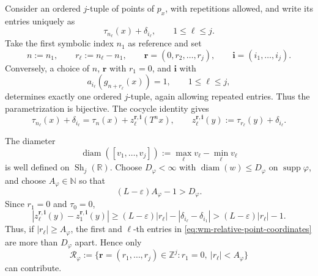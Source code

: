 \documentclass[11pt,reqno,a4paper]{amsart}
\numberwithin{equation}{section}
\theoremstyle{compact}
\theoremstyle{definition}
\theoremstyle{definition}
\newcommand{\Sh}{\operatorname{Sh}}
\begin{document}
Consider an ordered $j$-tuple of points of $p_x$, with repetitions allowed,
and write its entries uniquely as
\[
  \tau_{n_\ell}(x)+\delta_{i_\ell},
  \qquad 1\leq\ell\leq j.
\]
Take the first symbolic index $n_1$ as reference and set
\begin{equation}\label{eq:wm-relative-indices-definition}
  n:=n_1,
  \qquad
  r_\ell:=n_\ell-n_1,
  \qquad
  \mathbf r=(0,r_2,\ldots,r_j),
  \qquad
  \mathbf i=(i_1,\ldots,i_j).
\end{equation}
Conversely, a choice of $n$, $\mathbf r$ with $r_1=0$, and $\mathbf i$
with
\[
  a_{i_\ell}(g_{n+r_\ell}(x))=1,
  \qquad 1\leq\ell\leq j,
\]
determines exactly one ordered $j$-tuple, again allowing repeated entries.
Thus the parametrization is bijective.
The cocycle identity gives
\begin{equation}\label{eq:wm-relative-point-coordinates}
  \tau_{n_\ell}(x)+\delta_{i_\ell}
  =\tau_n(x)+z_\ell^{\mathbf r,\mathbf i}(T^nx),
  \qquad
  z_\ell^{\mathbf r,\mathbf i}(y)
  :=\tau_{r_\ell}(y)+\delta_{i_\ell}.
\end{equation}

The diameter
\begin{equation}\label{eq:wm-shape-diameter}
  \operatorname{diam}([v_1,\ldots,v_j])
  :=\max_\ell v_\ell-\min_\ell v_\ell
\end{equation}
is well defined on $\Sh_j(\mathbb R)$.  Choose $D_\varphi<\infty$ with
$\operatorname{diam}(w)\leq D_\varphi$ on $\operatorname{supp}\varphi$,
and choose $A_\varphi\in\mathbb N$ so that
\begin{equation}\label{eq:wm-relative-index-bound}
  (L-\varepsilon)A_\varphi-1>D_\varphi.
\end{equation}
Since $r_1=0$ and $\tau_0=0$,
\[
  |z_\ell^{\mathbf r,\mathbf i}(y)-z_1^{\mathbf r,\mathbf i}(y)|
  \geq (L-\varepsilon)|r_\ell|-|\delta_{i_\ell}-\delta_{i_1}|
  >(L-\varepsilon)|r_\ell|-1.
\]
Thus, if $|r_\ell|\geq A_\varphi$, the first and $\ell$-th entries in
\eqref{eq:wm-relative-point-coordinates} are more than $D_\varphi$ apart.
Hence only
\begin{equation}\label{eq:wm-relative-index-set}
  \mathscr R_\varphi
  :=\{\mathbf r=(r_1,\ldots,r_j)\in\mathbb Z^j:
       r_1=0,\ |r_\ell|<A_\varphi\}
\end{equation}
can contribute.
\end{document}
